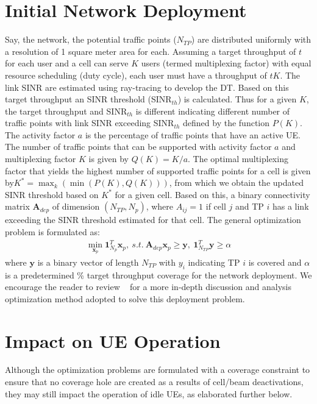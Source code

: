 \section{Initial Network Deployment}

{Say, the network, the potential traffic points ($N_{TP}$) are distributed uniformly with a resolution of 1 square meter area for each. Assuming a target throughput of $t$ for each user and a cell can serve $K$ users (termed multiplexing factor) with equal resource scheduling (duty cycle), each user must have a throughput of $tK$. %
The link SINR are estimated using ray-tracing to develop the DT. Based on this target throughput an SINR threshold (SINR$_{th}$) is calculated. Thus for a given $K$, the target throughput and SINR$_{th}$ is different indicating different number of traffic points with link SINR exceeding SINR$_{th}$ defined by the function $P(K)$.  The activity factor $a$ is the percentage of traffic points that have an active UE. The number of traffic points that can be supported with activity factor $a$ and multiplexing factor $K$ is given by $Q(K) = K/a$. 
The optimal multiplexing factor that yields the highest number of supported traffic points for a cell is given by$K^{*} =  \max_{k} (\min(P(K), Q(K)))$, from which we obtain the updated SINR threshold based on $K^{*}$ for a given cell. 
Based on this, a binary connectivity matrix $\bm{A}_{dep}$ of dimension $(N_{TP},N_p)$, where $A_{ij} = 1$ if cell $j$ and TP $i$ has a link exceeding the SINR threshold estimated for that cell.}
The general optimization problem is formulated as: 
\begin{align}\label{eq:deployment}
   \min_{\bm{x}_p} {\bm{1}^T_{N_p}}{\bm{x}_p} , ~s.t. ~ \bm{A}_{dep}\bm{x}_p \ge \bm{y}, ~ {\bm{1}^T_{N_{TP}}}\bm{y} \ge \alpha
\end{align}
{where $\bm{y}$ is a binary vector of length $N_{TP}$ with $y_i$ indicating TP $i$ is covered and $\alpha$ is a predetermined \% target throughput coverage for the network deployment.
We encourage the reader to review ~\cite{deployement_paper} for a more in-depth discussion and analysis optimization method adopted to solve this deployment problem.}

\section{Impact on UE Operation}
Although the optimization problems are formulated with a coverage constraint to ensure that no coverage hole are created as a results of cell/beam deactivations, they may still impact the operation of idle UEs, as elaborated further below.

